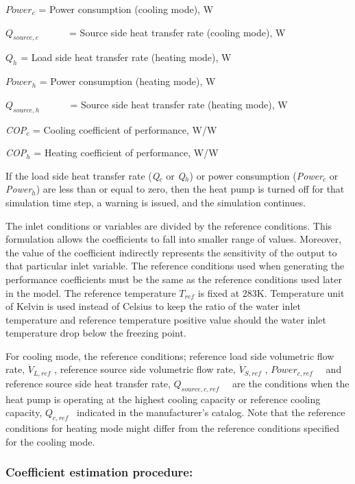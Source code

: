 \(Powe{r_c}\) = Power consumption (cooling mode), W

\({Q_{source,c}}\) ~~~~~ = Source side heat transfer rate (cooling mode), W

\({Q_h}\) = Load side heat transfer rate (heating mode), W

\(Powe{r_h}\) = Power consumption (heating mode), W

\({Q_{source,h}}\) ~~~~~ = Source side heat transfer rate (heating mode), W

\emph{COP\(_{c}\)} = Cooling coefficient of performance, W/W

\emph{COP\(_{h}\)} = Heating coefficient of performance, W/W

If the load side heat transfer rate (\emph{Q\(_{c}\)} or \emph{Q\(_{h}\)}) or power consumption (\emph{Power\(_{c}\)} or \emph{Power\(_{h}\)}) are less than or equal to zero, then the heat pump is turned off for that simulation time step, a warning is issued, and the simulation continues.

The inlet conditions or variables are divided by the reference conditions. This formulation allows the coefficients to fall into smaller range of values. Moreover, the value of the coefficient indirectly represents the sensitivity of the output to that particular inlet variable. The reference conditions used when generating the performance coefficients must be the same as the reference conditions used later in the model. The reference temperature \({T_{ref}}\) is fixed at 283K. Temperature unit of Kelvin is used instead of Celsius to keep the ratio of the water inlet temperature and reference temperature positive value should the water inlet temperature drop below the freezing point.

For cooling mode, the reference conditions; reference load side volumetric flow rate, \({\dot V_{L,ref}}\) , reference source side volumetric flow rate, \({\dot V_{S,ref}}\) , \(Powe{r_{c,ref}}\) ~~and reference source side heat transfer rate, \({Q_{source,c,ref}}\) ~~are the conditions when the heat pump is operating at the highest cooling capacity or reference cooling capacity, \({Q_{c,ref}}\) ~indicated in the manufacturer's catalog. Note that the reference conditions for heating mode might differ from the reference conditions specified for the cooling mode.

\subsubsection{Coefficient estimation procedure:}\label{coefficient-estimation-procedure-1}

